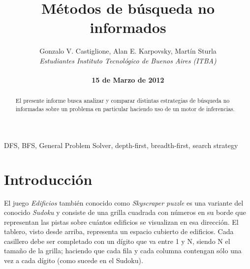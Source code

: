 \documentclass[%
	final,
	reprint,
	notitlepage,
	narroweqnarray,
	inline,
	twoside,
	invited
	]{ieee}
\begin{document}
\title[Métodos de búsqueda no informados]{%
       Métodos de búsqueda no informados}

\author[Castiglione, Karpovsky, Sturla]{Gonzalo V. Castiglione, Alan E. Karpovsky, Martín Sturla\\\textit{Estudiantes 
       Instituto Tecnológico de Buenos Aires (ITBA)}\\
\\\textbf{15 de Marzo de 2012}
}



\lognumber{}
\pubitemident{}


\maketitle               

\begin{abstract} 
El presente informe busca analizar y comparar distintas estrategias de búsqueda no informadas sobre un problema en particular haciendo uso de un motor de inferencias.
\end{abstract}

\begin{keywords}
DFS, BFS, General Problem Solver, depth-first, breadth-first, search strategy
\end{keywords}

\section{Introducción}

\PARstart El juego \textit{Edificios} también conocido como \textit{Skyscraper puzzle} es una variante del conocido \textit{Sudoku} y consiste de una grilla cuadrada con números en su borde que representan las pistas sobre cuántos edificios se visualizan en esa dirección. El tablero, visto desde arriba, representa un espacio cubierto de edificios. Cada casillero debe ser completado con un dígito que va entre 1 y N, siendo N el tamaño de la grilla; haciendo que cada fila y cada columna contengan sólo una vez a cada dígito (como sucede en el Sudoku).
\end{document}
